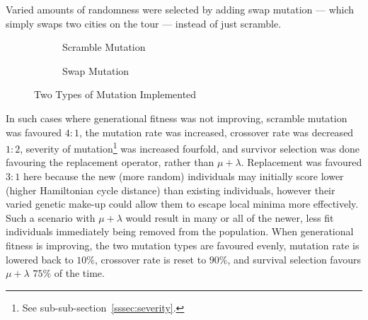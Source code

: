 Varied amounts of randomness were selected by adding swap mutation --- 
which simply swaps two cities on the tour --- instead 
of just scramble.

\begin{figure}[h]
	\centering
	\begin{subfigure}{\linewidth}
		\centering 
		\caption{Scramble Mutation\label{fig:scramble}}
	\end{subfigure}
	\par\vskip12pt
	\begin{subfigure}{\linewidth}
		\centering 
		\caption{Swap Mutation\label{fig:swap}}
	\end{subfigure}
	\caption{Two Types of Mutation Implemented}
\end{figure}

In such cases where generational fitness was not improving, 
scramble mutation was favoured $4:1$, the mutation rate was increased, crossover
rate was decreased $1:2$, severity of mutation\footnote{See
sub-sub-section~\ref{sssec:severity}.}
was increased fourfold, and survivor selection was done favouring the 
replacement operator, rather than $\mu + \lambda$.  
Replacement was favoured $3:1$ here because the new (more random) individuals 
may initially score lower (\ie higher Hamiltonian cycle distance) than existing 
individuals, however their varied genetic make-up could allow them to escape 
local minima more effectively. Such a 
scenario with $\mu + \lambda$ would result in many or all of the newer, less 
fit individuals immediately being removed from the population. When generational
fitness is improving, the two mutation types are favoured evenly, mutation rate is 
lowered back to $10\%$, crossover rate is reset to $90\%$, and survival
selection favours $\mu + \lambda$ $75\%$ of the time.

